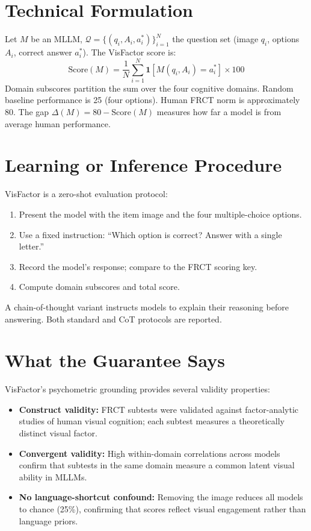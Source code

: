 \documentclass[10pt,twocolumn]{article}
\begin{document}
\section{Technical Formulation}

Let $M$ be an MLLM, $\mathcal{Q} = \{(q_i, A_i, a_i^*)\}_{i=1}^N$ the
question set (image $q_i$, options $A_i$, correct answer $a_i^*$). The
VisFactor score is:
\[
\text{Score}(M) = \frac{1}{N}\sum_{i=1}^N \mathbf{1}\!\left[M(q_i, A_i) = a_i^*\right] \times 100
\]
Domain subscores partition the sum over the four cognitive domains. Random
baseline performance is 25 (four options). Human FRCT norm is approximately 80.
The gap $\Delta(M) = 80 - \text{Score}(M)$ measures how far a model is
from average human performance.

\section{Learning or Inference Procedure}

VisFactor is a zero-shot evaluation protocol:

\begin{enumerate}[itemsep=2pt,parsep=0pt]
  \item Present the model with the item image and the four multiple-choice
    options.
  \item Use a fixed instruction: ``Which option is correct? Answer with a
    single letter.''
  \item Record the model's response; compare to the FRCT scoring key.
  \item Compute domain subscores and total score.
\end{enumerate}

A chain-of-thought variant instructs models to explain their reasoning before
answering. Both standard and CoT protocols are reported.

\section{What the Guarantee Says}

VisFactor's psychometric grounding provides several validity properties:

\begin{itemize}[itemsep=2pt,parsep=0pt]
  \item \textbf{Construct validity:} FRCT subtests were validated against
    factor-analytic studies of human visual cognition; each subtest measures
    a theoretically distinct visual factor.
  \item \textbf{Convergent validity:} High within-domain correlations across
    models confirm that subtests in the same domain measure a common latent
    visual ability in MLLMs.
  \item \textbf{No language-shortcut confound:} Removing the image reduces
    all models to chance (25\%), confirming that scores reflect visual
    engagement rather than language priors.
\end{itemize}
\end{document}
